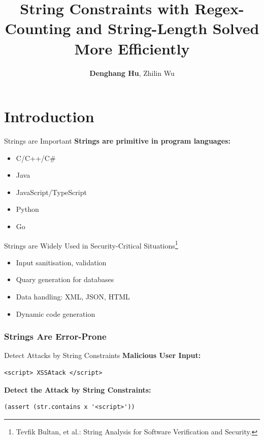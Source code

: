 \documentclass[landscape]{beamer}
\title{String Constraints with Regex-Counting and
String-Length Solved More Efficiently}
\author{\textbf{Denghang Hu}, Zhilin Wu}
\begin{document}
\frame{\titlepage}

\section{Introduction}

\begin{frame}{Strings are Important}
  \textbf{Strings are primitive in program languages:}
  \begin{itemize}
    \item C/C++/C\#
    \item Java
    \item JavaScript/TypeScript
    \item Python
    \item Go
  \end{itemize}
\end{frame}

\begin{frame}{Strings are Widely Used in Security-Critical Situations\footnote{Tevfik Bultan, et al.: String Analysis for Software Verification and Security.}}
  \begin{itemize}
    \item Input sanitisation, validation
    \item Quary generation for databases
    \item Data handling: XML, JSON, HTML
    \item Dynamic code generation
  \end{itemize}
\end{frame}


\begin{frame}
  \frametitle{Strings Are Error-Prone}
\end{frame}

\begin{frame}[fragile]{Detect Attacks by String Constraints}
  \textbf{Malicious User Input:}
  \begin{lstlisting}[style=myjs]
      <script> XSSAtack </script>
    \end{lstlisting}
  \textbf{Detect the Attack by String Constraints:}
  \begin{lstlisting}[style=myjs]
    (assert (str.contains x '<script>'))
  \end{lstlisting}
\end{frame}
\end{document}
